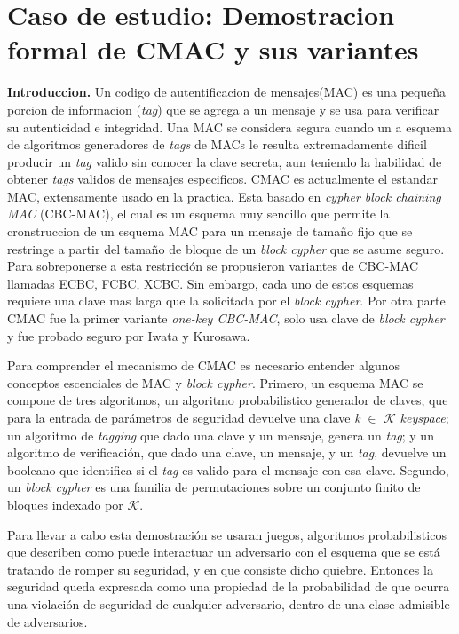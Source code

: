 \documentclass[runningheads]{llncs}
\begin{document}
\section{Caso de estudio: Demostracion formal de CMAC y sus variantes}
\textbf{Introduccion.} Un codigo de autentificacion de mensajes(MAC) es una pequeña porcion de informacion (\textit{tag}) que se agrega a un mensaje y se usa para verificar su autenticidad e integridad. Una MAC se considera segura cuando un a esquema de algoritmos generadores de \textit{tags} de MACs le resulta extremadamente dificil producir un \textit{tag} valido sin conocer la clave secreta, aun teniendo la habilidad de obtener \textit{tags} validos de mensajes especificos. CMAC es actualmente el estandar MAC, extensamente usado en la practica. Esta basado en \textit{cypher block chaining MAC} (CBC-MAC), el cual es un esquema muy sencillo que permite la cronstruccion de un esquema MAC para un mensaje de tamaño fijo que se restringe a partir del tamaño de bloque de un \textit{block cypher} que se asume seguro. Para sobreponerse a esta restricción se propusieron variantes de CBC-MAC llamadas ECBC, FCBC, XCBC. Sin embargo, cada uno de estos esquemas requiere una clave mas larga que la solicitada por el \textit{block cypher}. Por otra parte CMAC fue la primer variante \textit{one-key CBC-MAC}, solo usa clave de \textit{block cypher} y fue probado seguro por Iwata y Kurosawa.

Para comprender el mecanismo de CMAC es necesario entender algunos conceptos escenciales de MAC y \textit{block cypher}. Primero, un esquema MAC se compone de tres algoritmos, un algoritmo probabilistico generador de claves, que para la entrada de parámetros de seguridad devuelve una clave \textit{k} $\in$ $\mathcal{K}$ \textit{keyspace}; un algoritmo de \textit{tagging} que dado una clave y un mensaje, genera un \textit{tag}; y un algoritmo de verificación, que dado una clave, un mensaje, y un \textit{tag}, devuelve un booleano que identifica si el \textit{tag} es valido para el mensaje con esa clave. Segundo, un \textit{block cypher} es una familia de permutaciones sobre un conjunto finito de bloques indexado por $\mathcal{K}$.

Para llevar a cabo esta demostración se usaran juegos, algoritmos probabilisticos que describen como puede interactuar un adversario con el esquema que se está tratando de romper su seguridad, y en que consiste dicho quiebre. Entonces la seguridad queda expresada como una propiedad de la probabilidad de que ocurra una violación de seguridad de cualquier adversario, dentro de una clase admisible de adversarios. 
\end{document}
